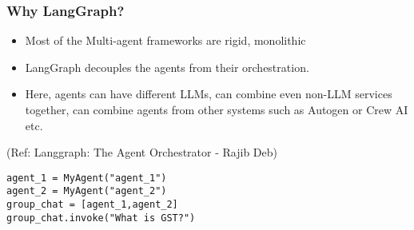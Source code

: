 \begin{frame}[fragile]\frametitle{Why LangGraph?}

\begin{itemize}
\item Most of the Multi-agent frameworks are rigid, monolithic
\item LangGraph decouples the agents from their orchestration.
\item Here, agents can have different LLMs, can combine even non-LLM services together, can combine agents from other systems such as Autogen or Crew AI etc.
\end{itemize}


{\tiny (Ref: Langgraph: The Agent Orchestrator - Rajib Deb)}

\begin{lstlisting}
agent_1 = MyAgent("agent_1")
agent_2 = MyAgent("agent_2")
group_chat = [agent_1,agent_2]
group_chat.invoke("What is GST?")
\end{lstlisting}

\end{frame}
